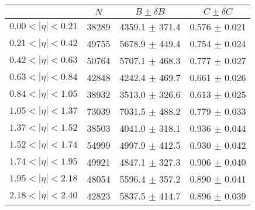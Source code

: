 \begin{tabular}{lccc}
\hline
    &   $N$   & $B \pm \delta B$  &  $C \pm \delta C$ \\
\hline
$0.00 < |\eta| <0.21$          & 38289      & 4359.1     $\pm$ 371.4 & 0.576      $\pm$ 0.021 \\
$0.21 < |\eta| <0.42$          & 49755      & 5678.9     $\pm$ 449.4 & 0.754      $\pm$ 0.024 \\
$0.42 < |\eta| <0.63$          & 50764      & 5707.1     $\pm$ 468.3 & 0.777      $\pm$ 0.027 \\
$0.63 < |\eta| <0.84$          & 42848      & 4242.4     $\pm$ 469.7 & 0.661      $\pm$ 0.026 \\
$0.84 < |\eta| <1.05$          & 38932      & 3513.0     $\pm$ 326.6 & 0.613      $\pm$ 0.025 \\
$1.05 < |\eta| <1.37$          & 73039      & 7031.5     $\pm$ 488.2 & 0.779      $\pm$ 0.033 \\
$1.37 < |\eta| <1.52$          & 38503      & 4041.0     $\pm$ 318.1 & 0.936      $\pm$ 0.044 \\
$1.52 < |\eta| <1.74$          & 54999      & 4997.9     $\pm$ 412.5 & 0.930      $\pm$ 0.042 \\
$1.74 < |\eta| <1.95$          & 49921      & 4847.1     $\pm$ 327.3 & 0.906      $\pm$ 0.040 \\
$1.95 < |\eta| <2.18$          & 48054      & 5596.4     $\pm$ 357.2 & 0.890      $\pm$ 0.041 \\
$2.18 < |\eta| <2.40$          & 42823      & 5837.5     $\pm$ 414.7 & 0.896      $\pm$ 0.039 \\
\hline
\end{tabular}
